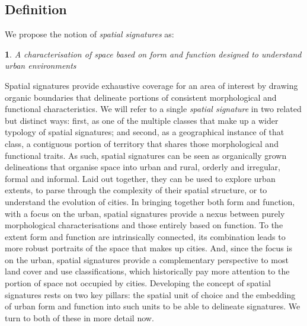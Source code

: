 \subsection{Definition}
\label{sec:ss_def}

We propose the notion of \textit{spatial signatures} as:

\newtheorem*{theorem}{}
\begin{theorem}
A characterisation of space based on form and function designed to understand
urban environments
\end{theorem}

Spatial signatures provide exhaustive coverage for an area of interest by
drawing organic boundaries that delineate portions of consistent morphological
and functional characteristics.
%
We will refer to a single \textit{spatial signature} in two related but
distinct ways: first, as one of the multiple classes that make up a wider
typology of spatial signatures; and second, as a geographical instance of that
class, a contiguous portion of territory that shares those morphological and
functional traits.
As such, spatial signatures can be seen as organically grown delineations that
organise space into urban and rural, orderly and irregular, formal and informal.
%
Laid out together, they can be used to explore urban extents, to parse through
the complexity of their spatial structure, or to understand the evolution of
cities.
In bringing together both form and function, with a focus on the urban,
spatial signatures provide a nexus between purely morphological
characterisations and those entirely based on function.
%
To the extent form and function are intrinsically connected, its
combination leads to more robust portraits of the space that makes up cities.
And, since the focus is on the urban, spatial signatures provide a complementary
perspective to most land cover and use classifications, which historically
pay more attention to the portion of space not occupied by cities.
Developing the concept of spatial signatures rests on two key pillars: the
spatial unit of choice and the embedding of urban form and function into such
units to be able to delineate signatures. We turn to both of these in more detail now.


